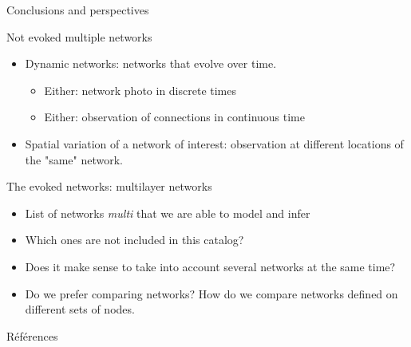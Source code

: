 \documentclass[compress,10pt]{beamer}
\begin{document}
    \begin{frame}{Conclusions and perspectives}
 
\begin{block}{Not evoked multiple networks}

\begin{itemize}
\item Dynamic networks: networks that evolve over time. 
\begin{itemize}
\item Either: network photo in discrete times
\item Either: observation of connections in continuous time
\end{itemize}

\item Spatial variation of a network of interest: observation at different locations of the "same" network. 
\end{itemize}
\end{block}


\begin{block}{The evoked networks: multilayer networks}

\begin{itemize}
\item List of networks \emph{multi} that we are able to model and infer
\item Which ones are not included in this catalog? 
\item Does it make sense to take into account several networks at the same time? 
\item Do we prefer comparing networks? How do we compare networks defined on different sets of nodes. 
\end{itemize}

\end{block}
\end{frame}
  


\begin{frame}[allowframebreaks]{Références}

 \small{ 
}
  \end{frame}
  
  
  
  
\end{document}

